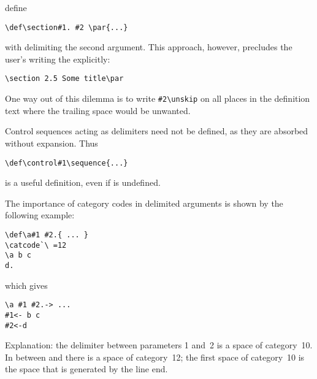 define
\begin{verbatim}
\def\section#1. #2 \par{...}
\end{verbatim}
with  delimiting the second
argument. This approach, however,
precludes  the user's writing the  explicitly:
\begin{verbatim}
\section 2.5 Some title\par
\end{verbatim}
One way out of this dilemma is to write
\verb>#2\unskip> on all places in the definition text
where the trailing space would be unwanted.

Control sequences acting as delimiters need not be defined,
as they are absorbed without expansion. Thus
\begin{verbatim}
\def\control#1\sequence{...}
\end{verbatim}
is a useful
definition, even if  is undefined.

The importance of category codes in delimited arguments
is shown by the following example:
\begin{verbatim}
\def\a#1 #2.{ ... }
\catcode`\ =12
\a b c
d.
\end{verbatim}
which gives
\begin{verbatim}
\a #1 #2.-> ...
#1<- b c
#2<-d
\end{verbatim}
Explanation: the delimiter between parameters 1 and~2 is a space
of category~10.
In between  and  there is a space
of category~12;
the first space of  category~10
is the space that is generated by the line end.

